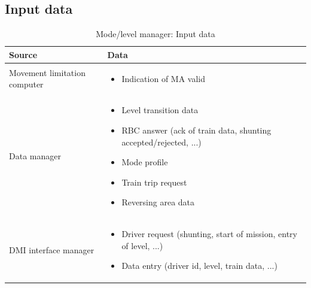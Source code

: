 \documentclass[nocc]{template/openetcs_report}
\begin{document}
\subsection{Input data}
			\begin{longtable}{|l|l|}
				\caption{Mode/level manager: Input data}\\ 
				\hline
				
					\begin{minipage}[t]{0.35\linewidth} \textbf{Source}	\end{minipage} 
				&	\begin{minipage}[t]{0.65\linewidth} \textbf{Data} \end{minipage} \\
				
				\hline
																																									
					\begin{minipage}[t]{0.35\linewidth} Movement limitation computer	\end{minipage} 
				&	\begin{minipage}[t]{0.65\linewidth}
						\begin{itemize}
							\item Indication of MA valid 
						\end{itemize}
					\end{minipage} \\
				
				\hline
				
					\begin{minipage}[t]{0.35\linewidth} Data manager	\end{minipage} 
				&	\begin{minipage}[t]{0.65\linewidth}
						\begin{itemize}
							\item Level transition data
							\item RBC answer (ack of train data, shunting accepted/rejected, ...)
							\item Mode profile
							\item Train trip request
							\item Reversing area data
						\end{itemize}			
					\end{minipage} \\
				
				\hline
					
					\begin{minipage}[t]{0.35\linewidth} DMI interface manager	\end{minipage} 
				&	\begin{minipage}[t]{0.65\linewidth}
						\begin{itemize}
							\item Driver request (shunting, start of mission, entry of level, ...)
							\item Data entry (driver id, level, train data, ...)
						\end{itemize}			
					\end{minipage} \\
				

\end{longtable}
\end{document}
